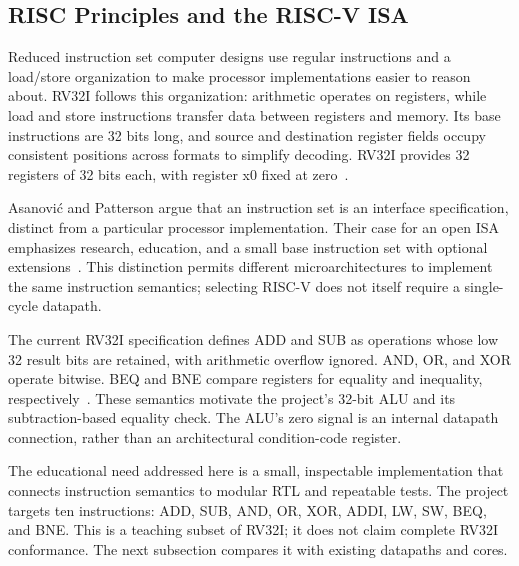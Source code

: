 \subsection{RISC Principles and the RISC-V ISA}
Reduced instruction set computer designs use regular instructions and a
load/store organization to make processor implementations easier to reason
about. RV32I follows this organization: arithmetic operates on registers,
while load and store instructions transfer data between registers and memory.
Its base instructions are 32 bits long, and source and destination register
fields occupy consistent positions across formats to simplify decoding.
RV32I provides 32 registers of 32 bits each, with register x0 fixed at
zero~\cite{riscv_unpriv_2026}.

Asanovi\'{c} and Patterson argue that an instruction set is an interface
specification, distinct from a particular processor implementation. Their
case for an open ISA emphasizes research, education, and a small base
instruction set with optional extensions~\cite{asanovic_patterson_2014}.
This distinction permits different microarchitectures to implement the
same instruction semantics; selecting RISC-V does not itself require a
single-cycle datapath.

The current RV32I specification defines ADD and SUB as operations whose
low 32 result bits are retained, with arithmetic overflow ignored. AND, OR,
and XOR operate bitwise. BEQ and BNE compare registers for equality and
inequality, respectively~\cite{riscv_unpriv_2026}. These semantics motivate
the project's 32-bit ALU and its subtraction-based equality check. The
ALU's zero signal is an internal datapath connection, rather than an
architectural condition-code register.

The educational need addressed here is a small, inspectable implementation
that connects instruction semantics to modular RTL and repeatable tests.
The project targets ten instructions: ADD, SUB, AND, OR, XOR, ADDI, LW,
SW, BEQ, and BNE. This is a teaching subset of RV32I; it does not claim
complete RV32I conformance. The next subsection compares it with
existing datapaths and cores.
